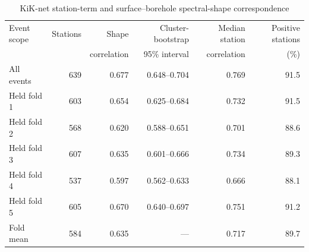 \documentclass[10pt]{article}
\begin{document}
\begin{table}[H]
\centering
\caption{MF2013 regression-domain sensitivity including the Kanno-PGA cutoff}
\scriptsize
{}
\end{table}

\begin{table}[H]
\centering
\caption{KiK-net station-term and surface--borehole spectral-shape correspondence}
\small
\begin{tabular}{lrrrrr}
\toprule
Event scope & Stations & Shape & Cluster-bootstrap & Median station & Positive stations \\
& & correlation & 95\% interval & correlation & (\%) \\
\midrule
All events & 639 & 0.677 & 0.648--0.704 & 0.769 & 91.5 \\
Held fold 1 & 603 & 0.654 & 0.625--0.684 & 0.732 & 91.5 \\
Held fold 2 & 568 & 0.620 & 0.588--0.651 & 0.701 & 88.6 \\
Held fold 3 & 607 & 0.635 & 0.601--0.666 & 0.734 & 89.3 \\
Held fold 4 & 537 & 0.597 & 0.562--0.633 & 0.666 & 88.1 \\
Held fold 5 & 605 & 0.670 & 0.640--0.697 & 0.751 & 91.2 \\
Fold mean & 584 & 0.635 & --- & 0.717 & 89.7 \\
\bottomrule
\end{tabular}
\end{table}
\end{document}
